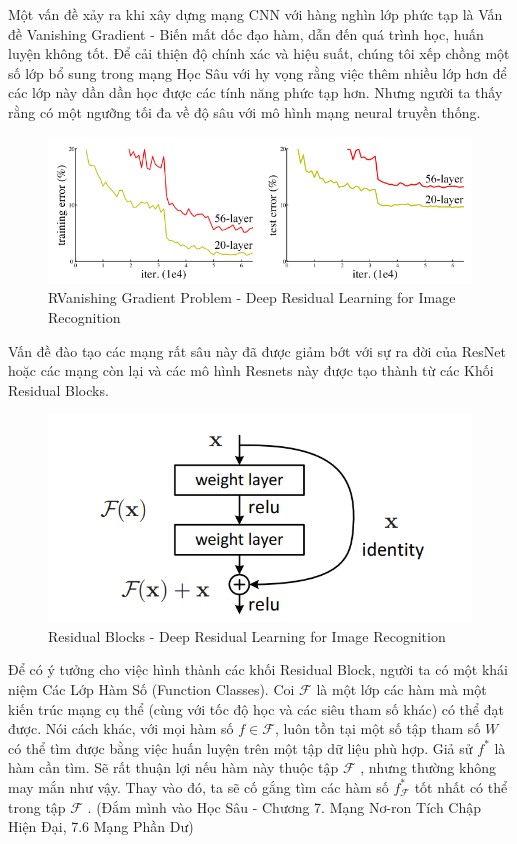 \documentclass{article}
\begin{document}
	Một vấn đề xảy ra khi xây dựng mạng CNN với hàng nghìn lớp phức tạp là Vấn đề Vanishing Gradient - Biến mất dốc đạo hàm, dẫn đến quá trình học, huấn luyện không tốt. Để cải thiện độ chính xác và hiệu suất, chúng tôi xếp chồng một số lớp bổ sung trong mạng Học Sâu với hy vọng rằng việc thêm nhiều lớp hơn để các lớp này dần dần học được các tính năng phức tạp hơn. Nhưng người ta thấy rằng có một ngưỡng tối đa về độ sâu với mô hình mạng neural truyền thống.
	\begin{figure}[H]
		\centering
		\includegraphics[width=1\linewidth]{architecture/Vanishing_Gradient.png}
		\caption{RVanishing Gradient Problem - Deep Residual Learning for Image Recognition}
		\label{fig:writing-thesis}
	\end{figure}
	Vấn đề đào tạo các mạng rất sâu này đã được giảm bớt với sự ra đời của ResNet hoặc các mạng còn lại và các mô hình Resnets này được tạo thành từ các Khối Residual Blocks.
	\begin{figure}[H]
		\centering
		\includegraphics[width=1\linewidth]{architecture/residual_learning_building_block.png}
		\caption{Residual Blocks - Deep Residual Learning for Image Recognition}
		\label{fig:writing-thesis}
	\end{figure}
	Để có ý tưởng cho việc hình thành các khối Residual Block, người ta có một khái niệm Các Lớp Hàm Số (Function Classes). Coi $\mathcal{F}$ là một lớp các hàm mà một kiến trúc mạng cụ thể (cùng với tốc độ học và các siêu tham số khác) có thể đạt được. Nói cách khác, với mọi hàm số $f \in \mathcal{F}$, luôn tồn tại một số tập tham số  $W$  có thể tìm được bằng việc huấn luyện trên một tập dữ liệu phù hợp. Giả sử  $f^{*}$  là hàm cần tìm. Sẽ rất thuận lợi nếu hàm này thuộc tập $\mathcal{F}$ , nhưng thường không may mắn như vậy. Thay vào đó, ta sẽ cố gắng tìm các hàm số $f^{*}_{\mathcal{F}}$ tốt nhất có thể trong tập $\mathcal{F}$ . (Đắm mình vào Học Sâu - Chương 7. Mạng Nơ-ron Tích Chập Hiện Đại, 7.6 Mạng Phần Dư)
\end{document}
